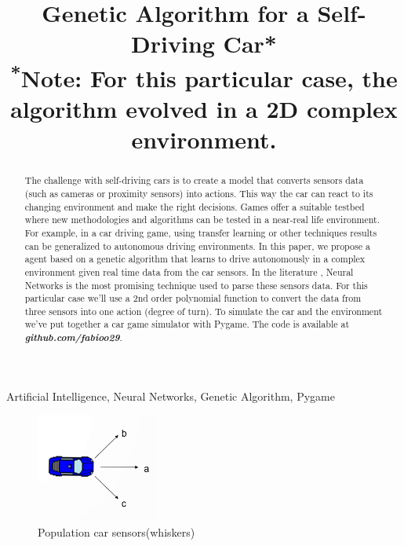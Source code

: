 \documentclass[conference]{IEEEtran}
\begin{document}
\title{Genetic Algorithm for a Self-Driving Car*\\
{\footnotesize \textsuperscript{*}Note: For this particular case, the algorithm evolved in a 2D complex environment.}
}

\author{
}

\maketitle

\begin{abstract}
    The challenge with self-driving cars is to create a model that converts sensors data (such as cameras or proximity sensors) into actions.
    This way the car can react to its changing environment and make the right decisions. Games oﬀer a suitable testbed where new methodologies
    and algorithms can be tested in a near-real life environment. For example, in a car driving game, using transfer learning or other techniques
    results can be generalized to autonomous driving environments. In this paper, we propose a agent based on a genetic algorithm that learns to
    drive autonomously in a complex environment given real time data from the car sensors. In the literature \cite{neelarghya_2021,mandav_2018,patel_2021}, Neural Networks is the most
    promising technique used to parse these sensors data. For this particular case we'll use a 2nd order polynomial function to convert the data
    from three sensors into one action (degree of turn). To simulate the car and the environment we've put together a car game simulator with Pygame.
    The code is available at \textbf{\textit{github.com/fabioo29}}.
\end{abstract}

\begin{IEEEkeywords}
    Artificial Intelligence, Neural Networks, Genetic Algorithm, Pygame
\end{IEEEkeywords}

\begin{figure}[b]
    \centerline{\includegraphics[width=40mm,scale=2]{assets/car-sensors.png}}
    \caption{Population car sensors(whiskers)}
    \label{fig:car-sensors}
\end{figure}
\end{document}
